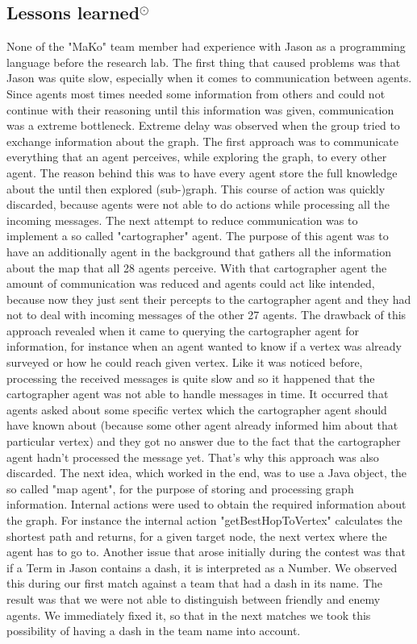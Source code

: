 \subsection{Lessons learned$^{\odot}$}
None of the "MaKo" team member had experience with Jason as a programming language before the research lab.
The first thing that caused problems was that Jason was quite slow, especially when it comes to communication between agents.
Since agents most times needed some information from others and could not continue with their reasoning until this information was given, communication was a extreme bottleneck.
Extreme delay was observed when the group tried to exchange information about the graph.
The first approach was to communicate everything that an agent perceives, while exploring the graph, to every other agent.
The reason behind this was to have every agent store the full knowledge about the until then explored (sub-)graph.
This course of action was quickly discarded, because agents were not able to do actions while processing all the incoming messages.
The next attempt to reduce communication was to implement a so called "cartographer" agent.
The purpose of this agent was to have an additionally agent in the background that gathers all the information about the map that all 28 agents perceive.
With that cartographer agent the amount of communication was reduced and agents could act like intended, because now they just sent their percepts to the cartographer agent and they had not to deal with incoming messages of the other 27 agents.
The drawback of this approach revealed when it came to querying the cartographer agent for information, for instance when an agent wanted to know if a vertex was already surveyed or how he could reach given vertex.
Like it was noticed before, processing the received messages is quite slow and so it happened that the cartographer agent was not able to handle messages in time.
It occurred that agents asked about some specific vertex which the cartographer agent should have known about (because some other agent already informed him about that particular vertex) and they got no answer due to the fact that the cartographer agent hadn't processed the message yet.
That's why this approach was also discarded.
The next idea, which worked in the end, was to use a Java object, the so called "map agent", for the purpose of storing and processing graph information.
Internal actions were used to obtain the required information about the graph.
For instance the internal action "getBestHopToVertex" calculates the shortest path and returns, for a given target node, the next vertex where the agent has to go to.
Another issue that arose initially during the contest was that if a Term in Jason contains a dash, it is interpreted as a Number.
We observed this during our first match against a team that had a dash in its name.
The result was that we were not able to distinguish between friendly and enemy agents.
We immediately fixed it, so that in the next matches we took this possibility of having a dash in the team name into account.

